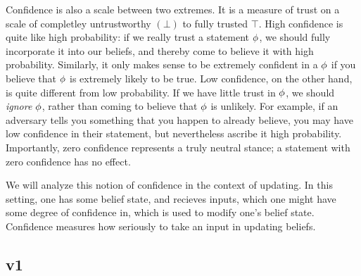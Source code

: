 \documentclass{article}
\begin{document}
Confidence is also a scale between two extremes. It is a measure of trust on a scale of completley untrustworthy $(\bot)$ to fully trusted $\top$. 
High confidence is quite like high probability: if we really trust a statement $\phi$, we should fully incorporate it into our beliefs, and thereby come to believe it with high probability. 
Similarly, it only makes sense to be extremely confident in a $\phi$ if you believe that $\phi$ is extremely likely to be true. 
Low confidence, on the other hand, is quite different from low probability. 
If we have little trust in $\phi$, we should \emph{ignore} $\phi$, rather than coming to believe that $\phi$ is unlikely.
For example, if an adversary tells you something that you happen to already believe, you may have low confidence in their statement, but nevertheless ascribe it high probability. 
Importantly, zero confidence represents a truly neutral stance; a statement with zero confidence has no effect.  

We will analyze this notion of confidence in the context of updating.
In this setting, one has some belief state, and recieves inputs, which one might have some degree of confidence in, which is used to modify one's belief state. 
Confidence measures how seriously to take an input in updating beliefs. 



\subsection*{v1}
\end{document}
